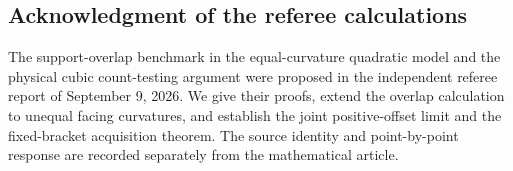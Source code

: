 \subsection*{Acknowledgment of the referee calculations}
The support-overlap benchmark in the equal-curvature quadratic model
and the physical cubic count-testing argument were proposed in the
independent referee report of September 9, 2026. We give their proofs,
extend the overlap calculation to unequal facing curvatures, and
establish the joint positive-offset limit and the fixed-bracket
acquisition theorem. The source identity and point-by-point response
are recorded separately from the mathematical article.
\appendix









